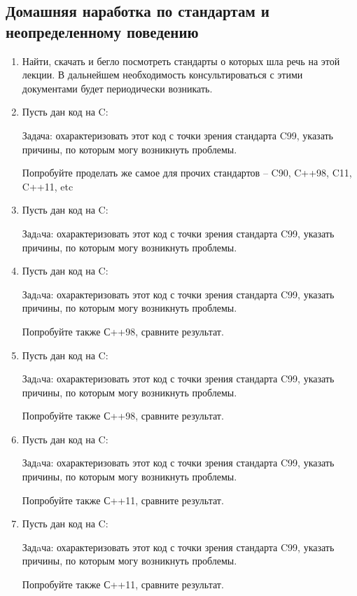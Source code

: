 \documentclass[a4paper,12pt,oneside]{article}
\begin{document}
\pagebreak
\subsection{Домашняя наработка по стандартам и неопределенному поведению}\label{StandHomework}
\begin{enumerate}
\item
Найти, скачать и бегло посмотреть стандарты о которых шла речь на этой лекции. В дальнейшем необходимость консультироваться с этими документами будет периодически возникать.
\item
Пусть дан код на C:



Задача: охарактеризовать этот код с точки зрения стандарта C99, указать причины, по которым могу возникнуть проблемы.

Попробуйте проделать же самое для прочих стандартов -- C90, C++98, C11, C++11, etc

\item
Пусть дан код на C:



Задaча: охарактеризовать этот код с точки зрения стандарта C99, указать причины, по которым могу возникнуть проблемы.

\item
Пусть дан код на C:



Задaча: охарактеризовать этот код с точки зрения стандарта C99, указать причины, по которым могу возникнуть проблемы.

Попробуйте также С++98, сравните результат.

\item
Пусть дан код на C:



Задaча: охарактеризовать этот код с точки зрения стандарта C99, указать причины, по которым могу возникнуть проблемы. 

Попробуйте также С++98, сравните результат.

\item
Пусть дан код на C:



Задaча: охарактеризовать этот код с точки зрения стандарта C99, указать причины, по которым могу возникнуть проблемы.

Попробуйте также С++11, сравните результат.

\item
Пусть дан код на C:



Задaча: охарактеризовать этот код с точки зрения стандарта C99, указать причины, по которым могу возникнуть проблемы.

Попробуйте также С++11, сравните результат.

\end{enumerate}
\end{document}
